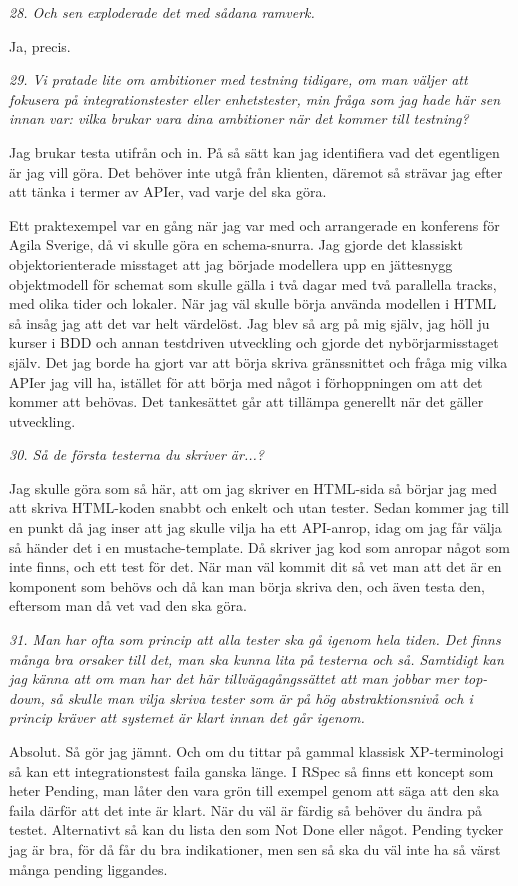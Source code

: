 \documentclass[11pt]{article}
\begin{document}
\emph{28. Och sen exploderade det med sådana ramverk.}

Ja, precis.

\emph{29. Vi pratade lite om ambitioner med testning tidigare, om man väljer att fokusera på integrationstester eller enhetstester, min fråga som jag hade här sen innan var: vilka brukar vara dina ambitioner när det kommer till testning?}

Jag brukar testa utifrån och in. På så sätt kan jag identifiera vad det egentligen är jag vill göra. Det behöver inte utgå från klienten, däremot så strävar jag efter att tänka i termer av APIer, vad varje del ska göra.

Ett praktexempel var en gång när jag var med och arrangerade en konferens för Agila Sverige, då vi skulle göra en schema-snurra. Jag gjorde det klassiskt objektorienterade misstaget att jag började modellera upp en jättesnygg objektmodell för schemat som skulle gälla i två dagar med två parallella tracks, med olika tider och lokaler. När jag väl skulle börja använda modellen i HTML så insåg jag att det var helt värdelöst. Jag blev så arg på mig själv, jag höll ju kurser i BDD och annan testdriven utveckling och gjorde det nybörjarmisstaget själv. Det jag borde ha gjort var att börja skriva gränssnittet och fråga mig vilka APIer jag vill ha, istället för att börja med något i förhoppningen om att det kommer att behövas. Det tankesättet går att tillämpa generellt när det gäller utveckling.

\emph{30. Så de första testerna du skriver är...?}

Jag skulle göra som så här, att om jag skriver en HTML-sida så börjar jag med att skriva HTML-koden snabbt och enkelt och utan tester. Sedan kommer jag till en punkt då jag inser att jag skulle vilja ha ett API-anrop, idag om jag får välja så händer det i en mustache-template. Då skriver jag kod som anropar något som inte finns, och ett test för det. När man väl kommit dit så vet man att det är en komponent som behövs och då kan man börja skriva den, och även testa den, eftersom man då vet vad den ska göra.

\emph{31. Man har ofta som princip att alla tester ska gå igenom hela tiden. Det finns många bra orsaker till det, man ska kunna lita på testerna och så. Samtidigt kan jag känna att om man har det här tillvägagångssättet att man jobbar mer top-down, så skulle man vilja skriva tester som är på hög abstraktionsnivå och i princip kräver att systemet är klart innan det går igenom.}

Absolut. Så gör jag jämnt. Och om du tittar på gammal klassisk XP-terminologi så kan ett integrationstest faila ganska länge. I RSpec så finns ett koncept som heter Pending, man låter den vara grön till exempel genom att säga att den ska faila därför att det inte är klart. När du väl är färdig så behöver du ändra på testet. Alternativt så kan du lista den som Not Done eller något. Pending tycker jag är bra, för då får du bra indikationer, men sen så ska du väl inte ha så värst många pending liggandes.
\end{document}
